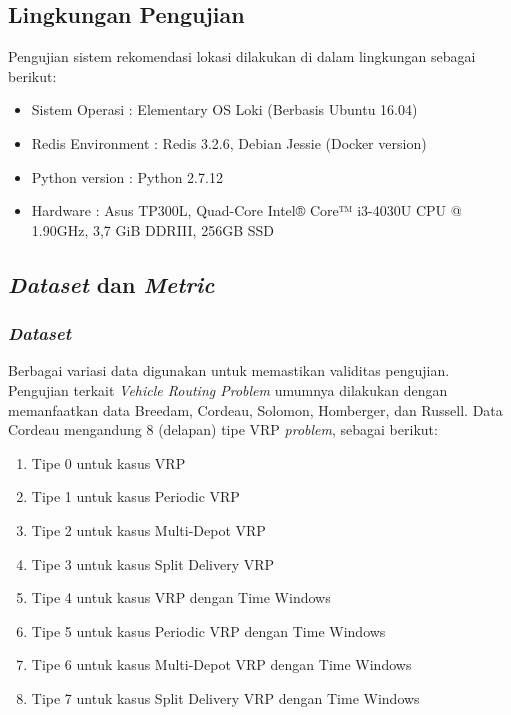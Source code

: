 \subsection{Lingkungan Pengujian}
\label{ssec:test-environment}
Pengujian sistem rekomendasi lokasi dilakukan di dalam lingkungan sebagai berikut:
\begin{itemize}
	\item Sistem Operasi		: Elementary OS Loki (Berbasis Ubuntu 16.04)
	\item Redis Environment		: Redis 3.2.6, Debian Jessie (Docker version)
	\item Python version		: Python 2.7.12
	\item Hardware				: Asus TP300L, Quad-Core Intel® Core™ i3-4030U CPU @ 1.90GHz, 3,7 GiB DDRIII, 256GB SSD
\end{itemize}


\subsection{\textit{Dataset} dan \textit{Metric}}
\subsubsection{\textit{Dataset}}
Berbagai variasi data digunakan untuk memastikan validitas pengujian. Pengujian terkait \textit{Vehicle Routing Problem} umumnya dilakukan dengan memanfaatkan data Breedam, Cordeau, Solomon, Homberger, dan Russell. Data Cordeau mengandung 8 (delapan) tipe VRP \textit{problem}, sebagai berikut:

\begin{enumerate}
	\item Tipe 0 untuk kasus VRP
	\item Tipe 1 untuk kasus Periodic VRP
	\item Tipe 2 untuk kasus Multi-Depot VRP
	\item Tipe 3 untuk kasus Split Delivery VRP
	\item Tipe 4 untuk kasus VRP dengan Time Windows
	\item Tipe 5 untuk kasus Periodic VRP dengan Time Windows
	\item Tipe 6 untuk kasus Multi-Depot VRP dengan Time Windows
	\item Tipe 7 untuk kasus Split Delivery VRP dengan Time Windows
\end{enumerate}

